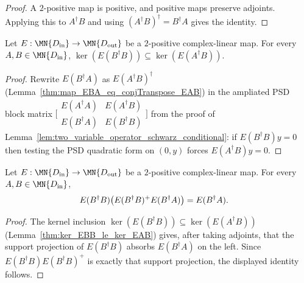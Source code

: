 \begin{proof}\leanok
    A $2$-positive map is positive, and positive maps preserve adjoints.
    Applying this to $A^\dagger B$ and using
    $(A^\dagger B)^\dagger = B^\dagger A$ gives the identity.
\end{proof}

\begin{theorem}
    \label{thm:ker_EBB_le_ker_EAB}
    \leanok
    Let $E:\MN{D_{\rm in}}\to\MN{D_{\rm out}}$ be a $2$-positive
    complex-linear map. For every $A,B\in\MN{D_{\rm in}}$,
    $\ker(E(B^\dagger B))\subseteq\ker(E(A^\dagger B))$.
\end{theorem}

\begin{proof}\leanok
    Rewrite $E(B^\dagger A)$ as $E(A^\dagger B)^\dagger$
    (Lemma~\ref{thm:map_EBA_eq_conjTranspose_EAB}) in the ampliated PSD
    block matrix $\bigl[\begin{smallmatrix}
        E(A^\dagger A) & E(A^\dagger B)\\
        E(B^\dagger A) & E(B^\dagger B)
    \end{smallmatrix}\bigr]$ from the proof of
    Lemma~\ref{lem:two_variable_operator_schwarz_conditional}: if
    $E(B^\dagger B)y=0$ then testing the PSD quadratic form on $(0,y)$
    forces $E(A^\dagger B)y=0$.
\end{proof}

\begin{theorem}
    \label{thm:EBB_mul_pinv_mul_EBA_eq}
    \leanok
    Let $E:\MN{D_{\rm in}}\to\MN{D_{\rm out}}$ be a $2$-positive
    complex-linear map. For every $A,B\in\MN{D_{\rm in}}$,
    \begin{align}
        E(B^\dagger B)\bigl(E(B^\dagger B)^{+}E(B^\dagger A)\bigr)
         & = E(B^\dagger A).
        \notag
    \end{align}
\end{theorem}

\begin{proof}\leanok
    The kernel inclusion $\ker(E(B^\dagger B))\subseteq\ker(E(A^\dagger B))$
    (Lemma~\ref{thm:ker_EBB_le_ker_EAB}) gives, after taking adjoints, that
    the support projection of $E(B^\dagger B)$ absorbs $E(B^\dagger A)$ on
    the left. Since $E(B^\dagger B)E(B^\dagger B)^{+}$ is exactly that
    support projection, the displayed identity follows.
\end{proof}

